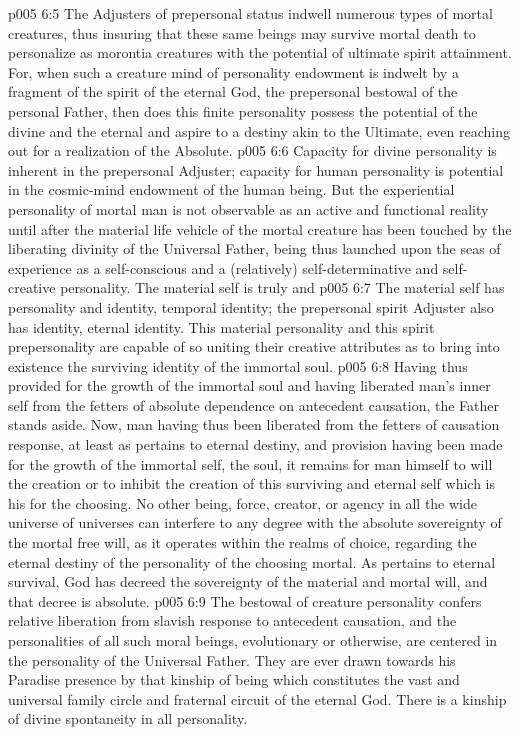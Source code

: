 \pc \vs p005 6:5 The Adjusters of prepersonal status indwell numerous types of mortal creatures, thus insuring that these same beings may survive mortal death to personalize as morontia creatures with the potential of ultimate spirit attainment. For, when such a creature mind of personality endowment is indwelt by a fragment of the spirit of the eternal God, the prepersonal bestowal of the personal Father, then does this finite personality possess the potential of the divine and the eternal and aspire to a destiny akin to the Ultimate, even reaching out for a realization of the Absolute.
\vs p005 6:6 Capacity for divine personality is inherent in the prepersonal Adjuster; capacity for human personality is potential in the cosmic\hyp{}mind endowment of the human being. But the experiential personality of mortal man is not observable as an active and functional reality until after the material life vehicle of the mortal creature has been touched by the liberating divinity of the Universal Father, being thus launched upon the seas of experience as a self\hyp{}conscious and a (relatively) self\hyp{}determinative and self\hyp{}creative personality. The material self is truly and 
\pc \vs p005 6:7 The material self has personality and identity, temporal identity; the prepersonal spirit Adjuster also has identity, eternal identity. This material personality and this spirit prepersonality are capable of so uniting their creative attributes as to bring into existence the surviving identity of the immortal soul.
\vs p005 6:8 Having thus provided for the growth of the immortal soul and having liberated man’s inner self from the fetters of absolute dependence on antecedent causation, the Father stands aside. Now, man having thus been liberated from the fetters of causation response, at least as pertains to eternal destiny, and provision having been made for the growth of the immortal self, the soul, it remains for man himself to will the creation or to inhibit the creation of this surviving and eternal self which is his for the choosing. No other being, force, creator, or agency in all the wide universe of universes can interfere to any degree with the absolute sovereignty of the mortal free will, as it operates within the realms of choice, regarding the eternal destiny of the personality of the choosing mortal. As pertains to eternal survival, God has decreed the sovereignty of the material and mortal will, and that decree is absolute.
\pc \vs p005 6:9 The bestowal of creature personality confers relative liberation from slavish response to antecedent causation, and the personalities of all such moral beings, evolutionary or otherwise, are centered in the personality of the Universal Father. They are ever drawn towards his Paradise presence by that kinship of being which constitutes the vast and universal family circle and fraternal circuit of the eternal God. There is a kinship of divine spontaneity in all personality.
